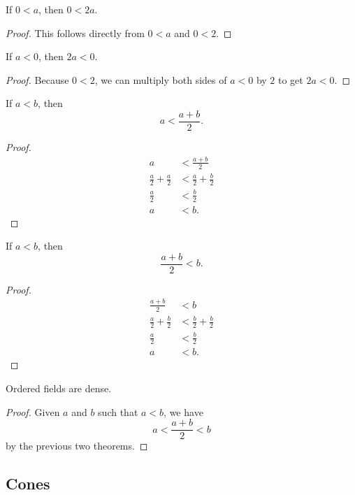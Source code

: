 \documentclass[../../math.tex]{subfiles}
\begin{document}
\begin{theorem}
    If $0 < a$, then $0 < 2a$.
\end{theorem}
\begin{proof}
    This follows directly from $0 < a$ and $0 < 2$.
\end{proof}

\begin{theorem}
    If $a < 0$, then $2a < 0$.
\end{theorem}
\begin{proof}
    Because $0 < 2$, we can multiply both sides of $a < 0$ by $2$ to get $2a <
    0$.
\end{proof}

\begin{theorem}
    If $a < b$, then
    \[
        a < \frac{a + b}{2}.
    \]
\end{theorem}
\begin{proof}
    \begin{align*}
        a &< \frac{a + b}{2} \\
        \frac{a}{2} + \frac{a}{2} &< \frac{a}{2} + \frac{b}{2} \\
        \frac{a}{2} &< \frac{b}{2} \\
        a &< b.
    \end{align*}
\end{proof}

\begin{theorem}
    If $a < b$, then
    \[
        \frac{a + b}{2} < b.
    \]
\end{theorem}
\begin{proof}
    \begin{align*}
        \frac{a + b}{2} &< b \\
        \frac{a}{2} + \frac{b}{2} &< \frac{b}{2} + \frac{b}{2} \\
        \frac{a}{2} &< \frac{b}{2} \\
        a &< b.
    \end{align*}
\end{proof}

\begin{instance}
    Ordered fields are dense.
\end{instance}
\begin{proof}
    Given $a$ and $b$ such that $a < b$, we have
    \[
        a < \frac{a + b}{2} < b
    \]
    by the previous two theorems.
\end{proof}

\subsection{Cones}
\end{document}

